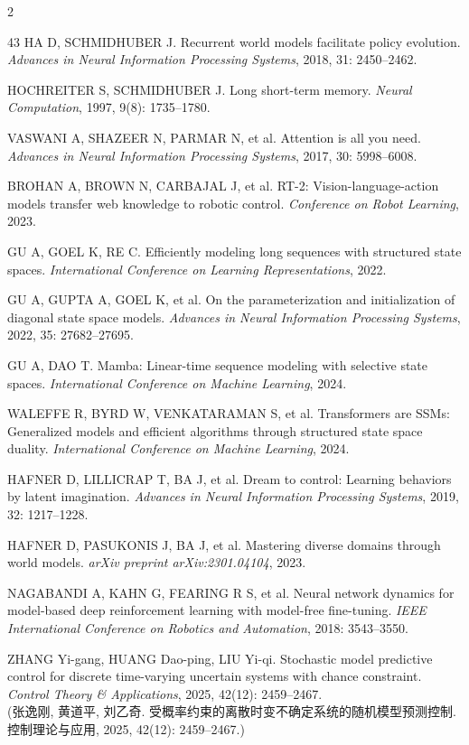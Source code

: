 \begin{multicols}{2}
{\begin{thebibliography}{43}
HA D, SCHMIDHUBER J. Recurrent world models facilitate policy evolution. {\it Advances in Neural Information Processing Systems}, 2018, 31: 2450--2462.

HOCHREITER S, SCHMIDHUBER J. Long short-term memory. {\it Neural Computation}, 1997, 9(8): 1735--1780.

VASWANI A, SHAZEER N, PARMAR N, et al. Attention is all you need. {\it Advances in Neural Information Processing Systems}, 2017, 30: 5998--6008.

BROHAN A, BROWN N, CARBAJAL J, et al. RT-2: Vision-language-action models transfer web knowledge to robotic control. {\it Conference on Robot Learning}, 2023.

GU A, GOEL K, RE C. Efficiently modeling long sequences with structured state spaces. {\it International Conference on Learning Representations}, 2022.

GU A, GUPTA A, GOEL K, et al. On the parameterization and initialization of diagonal state space models. {\it Advances in Neural Information Processing Systems}, 2022, 35: 27682--27695.

GU A, DAO T. Mamba: Linear-time sequence modeling with selective state spaces. {\it International Conference on Machine Learning}, 2024.

WALEFFE R, BYRD W, VENKATARAMAN S, et al. Transformers are SSMs: Generalized models and efficient algorithms through structured state space duality. {\it International Conference on Machine Learning}, 2024.

HAFNER D, LILLICRAP T, BA J, et al. Dream to control: Learning behaviors by latent imagination. {\it Advances in Neural Information Processing Systems}, 2019, 32: 1217--1228.

HAFNER D, PASUKONIS J, BA J, et al. Mastering diverse domains through world models. {\it arXiv preprint arXiv:2301.04104}, 2023.

NAGABANDI A, KAHN G, FEARING R S, et al. Neural network dynamics for model-based deep reinforcement learning with model-free fine-tuning. {\it IEEE International Conference on Robotics and Automation}, 2018: 3543--3550.

ZHANG Yi-gang, HUANG Dao-ping, LIU Yi-qi. Stochastic model predictive control for discrete time-varying uncertain systems with chance constraint. {\it Control Theory \& Applications}, 2025, 42(12): 2459--2467.\\(张逸刚, 黄道平, 刘乙奇. 受概率约束的离散时变不确定系统的随机模型预测控制. 控制理论与应用, 2025, 42(12): 2459--2467.)


\end{thebibliography}}
\end{multicols}

